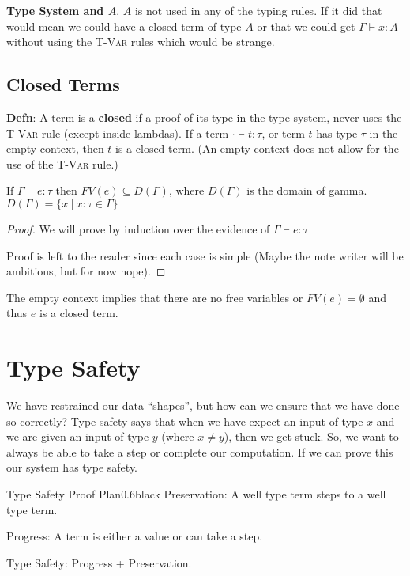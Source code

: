 \documentclass{lecturenotes}
\newenvironment{theorem}[2][Theorem]{\begin{trivlist}
\item[\hskip \labelsep {\bfseries #1}\hskip \labelsep {\bfseries #2.}]}{\end{trivlist}}
\newenvironment{corollary}[2][Corollary]{\begin{trivlist}
\item[\hskip \labelsep {\bfseries #1}\hskip \labelsep {\bfseries #2.}]}{\end{trivlist}}
\begin{document}
\textbf{Type System and $A$}. $A$ is not used in any of the typing rules. 
  If it did that would mean we could have a closed term of type $A$ or that we could get $\Gamma \vdash x : A$ without using the \textsc{T-Var} rules which would be strange. 

\subsection{Closed Terms}

\textbf{Defn}: A term is a \textbf{closed} if a proof of its type in the type system, never uses the \textsc{T-Var} rule (except inside lambdas). 
  If a term $\cdot \vdash t : \tau$, or term $t$ has type $\tau$ in the empty context, then $t$ is a closed term. (An empty context does not allow for the use of the \textsc{T-Var} rule.)

\begin{theorem}{FV Domain}
  If $\Gamma \vdash e : \tau$ then $FV(e) \subseteq D(\Gamma)$, where $D(\Gamma)$ is the domain of gamma.  $D(\Gamma) = \{x ~|~ x : \tau \in\Gamma\}$
\end{theorem}

\begin{proof}
  We will prove by induction over the evidence of $\Gamma \vdash e : \tau$   
  
  Proof is left to the reader since each case is simple (Maybe the note writer will be ambitious, but for now nope).
\end{proof}


\begin{corollary}{FV of emtpy context}
  The empty context implies that there are no free variables or $FV(e) = \emptyset$ and thus $e$ is a closed term.     
\end{corollary}


\section{Type Safety}

We have restrained our data ``shapes'', but how can we ensure that we have done so correctly? 
  Type safety says that when we have expect an input of type $x$ and we are given an input of type $y$ (where $ x \neq y$), then we get stuck. 
  So, we want to always be able to take a step or complete our computation. 
  If we can prove this our system has type safety.

\begin{center}
\begin{alert}{Type Safety Proof Plan}{0.6\textwidth}{black}
  Preservation: A well type term steps to a well type term.

  Progress: A term is either a value or can take a step. 

  Type Safety: Progress + Preservation.   
\end{alert}
\end{center}
\end{document}
